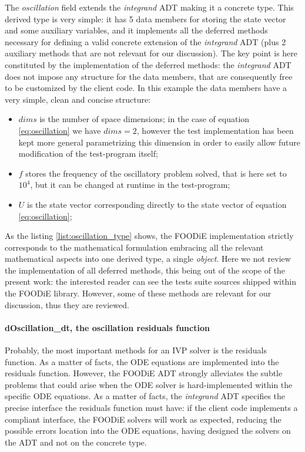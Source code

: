 \documentclass[pdftex,preprint,3p,times,numbers]{elsarticle}
\begin{document}
The \emph{oscillation} field extends the \emph{integrand} ADT making it a concrete type. This derived type is very simple: it has 5 data members for storing the state vector and some auxiliary variables, and it implements all the deferred methods necessary for defining a valid concrete extension of the \emph{integrand} ADT (plus 2 auxiliary methods that are not relevant for our discussion). The key point is here constituted by the implementation of the deferred methods: the \emph{integrand} ADT does not impose any structure for the data members, that are consequently free to be customized by the client code. In this example the data members have a very simple, clean and concise structure:
\begin{itemize}
  \item $dims$ is the number of space dimensions; in the case of equation \ref{eq:oscillation} we have $dims=2$, however the test implementation has been kept more general parametrizing this dimension in order to easily allow future modification of the test-program itself;
  \item $f$ stores the frequency of the oscillatory problem solved, that is here set to $10^{4}$, but it can be changed at runtime in the test-program;
  \item $U$ is the state vector corresponding directly to the state vector of equation \ref{eq:oscillation};
  \end{itemize}

As the listing \ref{list:oscillation_type} shows, the FOODiE implementation strictly corresponds to the mathematical formulation embracing all the relevant mathematical aspects into one derived type, a single \emph{object}. Here we not review the implementation of all deferred methods, this being out of the scope of the present work: the interested reader can see the tests suite sources shipped within the FOODiE library. However, some of these methods are relevant for our discussion, thus they are reviewed.

\paragraph{dOscillation\_dt, the oscillation residuals function}

Probably, the most important methods for an IVP solver is the residuals function. As a matter of facts, the ODE equations are implemented into the residuals function. However, the FOODiE ADT strongly alleviates the subtle problems that could arise when the ODE solver is hard-implemented within the specific ODE equations. As a matter of facts, the \emph{integrand} ADT specifies the precise interface the residuals function must have: if the client code implements a compliant interface, the FOODiE solvers will work as expected, reducing the possible errors location into the ODE equations, having designed the solvers on the ADT and not on the concrete type.
\end{document}
